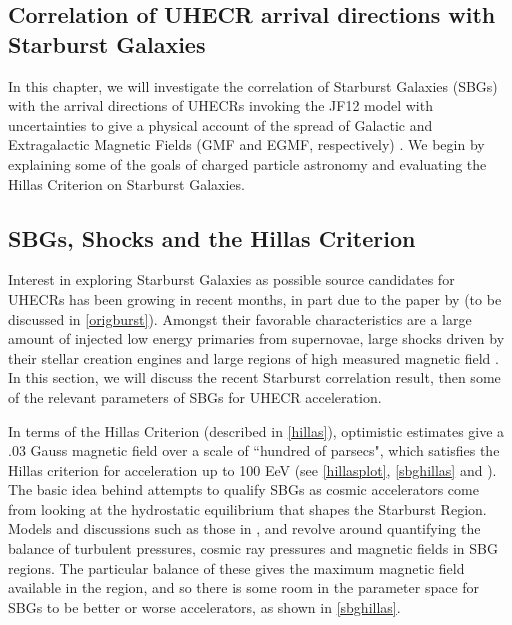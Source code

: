 \begin{singlespace}
\chapter{Correlation of UHECR arrival directions with Starburst Galaxies}
\end{singlespace}
In this chapter, we will investigate the correlation of Starburst Galaxies (SBGs) with the arrival directions of UHECRs invoking the JF12 model with uncertainties to give a physical account of the spread of Galactic and Extragalactic Magnetic Fields (GMF and EGMF, respectively) \cite{jf12,sean}. We begin by explaining some of the goals of charged particle astronomy and evaluating the Hillas Criterion on Starburst Galaxies.
\section{SBGs, Shocks and the Hillas Criterion} %
Interest in exploring Starburst Galaxies as possible source candidates for UHECRs has been growing in recent months, in part due to the paper by  (to be discussed in \autoref{origburst}). Amongst their favorable characteristics are a large amount of injected low energy primaries from supernovae, large shocks driven by their stellar creation engines and large regions of high measured magnetic field \cite{starwinds,waxmansbg}. In this section, we will discuss the recent Starburst correlation result, then some of the relevant parameters of SBGs for UHECR acceleration.

In terms of the Hillas Criterion (described in \autoref{hillas}), optimistic estimates give a .03 Gauss magnetic field over a scale of ``hundred of parsecs", which satisfies the Hillas criterion for acceleration up to 100 EeV (see \autoref{hillasplot}, \autoref{sbghillas} and \textcite{waxmansbg}). The basic idea behind attempts to qualify SBGs as cosmic accelerators come from looking at the hydrostatic equilibrium that shapes the Starburst Region. Models and discussions such as those in ,  and  revolve around quantifying the balance of turbulent pressures, cosmic ray pressures and magnetic fields in SBG regions. The particular balance of these gives the maximum magnetic field available in the region, and so there is some room in the parameter space for SBGs to be better or worse accelerators, as shown in \autoref{sbghillas}.

